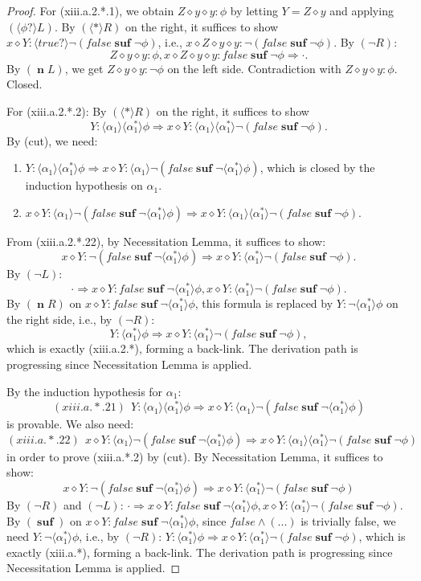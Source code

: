 \documentclass[manuscript,screen]{acmart}
\newcommand{\la}[0]{\langle}
\newcommand{\ra}[0]{\rangle}
\newcommand{\true}[0]{\mathit{true}}
\newcommand{\false}[0]{\mathit{false}}
\newcommand{\lup}[0]{*}
\newcommand{\cat}[0]{\diamond}
\DeclareMathOperator{\osuf}{\mathbf{suf}}
\DeclareMathOperator{\nxt}{\mathbf{n}}
\begin{document}
\begin{proof}
For (xiii.a.2.*.1), we obtain $Z\cat y\cat y : \phi$ by letting $Y = Z\cat y$ and applying $(\la\phi?\ra L)$. By $(\la\lup\ra R)$ on the right, it suffices to show $x\cat Y : \la\true?\ra\neg(\false\osuf\neg\phi)$, i.e., $x\cat Z\cat y\cat y : \neg(\false\osuf\neg\phi)$. By $(\neg R)$: 
$$Z\cat y\cat y : \phi, x\cat Z\cat y\cat y : \false\osuf\neg\phi\Rightarrow \cdot.$$ 
By $(\nxt L)$, we get $Z\cat y\cat y : \neg\phi$ on the left side. Contradiction with $Z\cat y\cat y : \phi$. Closed.

For (xiii.a.2.*.2): By $(\la\lup\ra R)$ on the right, it suffices to show 
$$Y : \la\alpha_1\ra\la\alpha^*_1\ra\phi\Rightarrow x\cat Y : \la\alpha_1\ra\la\alpha_1^*\ra\neg(\false\osuf\neg\phi).$$
By (cut), we need:
\begin{enumerate}
\item[(xiii.a.2.*.21)] $Y : \la\alpha_1\ra\la\alpha_1^*\ra\phi\Rightarrow x\cat Y : \la\alpha_1\ra\neg(\false\osuf\neg\la\alpha_1^*\ra\phi)$, which is closed by the induction hypothesis on $\alpha_1$. 
\item[(xiii.a.2.*.22)] $x\cat Y : \la\alpha_1\ra\neg(\false\osuf\neg\la\alpha_1^*\ra\phi)\Rightarrow x\cat Y : \la\alpha_1\ra\la\alpha_1^*\ra\neg(\false\osuf\neg\phi)$. 
\end{enumerate}
From (xiii.a.2.*.22), by Necessitation Lemma, it suffices to show:
$$
x\cat Y : \neg(\false\osuf\neg\la\alpha_1^*\ra\phi)\Rightarrow x\cat Y : \la\alpha_1^*\ra\neg(\false\osuf\neg\phi). 
$$
By $(\neg L)$: $$\cdot\Rightarrow x\cat Y : \false\osuf\neg\la\alpha_1^*\ra\phi, x\cat Y : \la\alpha_1^*\ra\neg(\false\osuf\neg\phi).$$ 
By $(\nxt R)$ on $x\cat Y : \false\osuf\neg\la\alpha_1^*\ra\phi$, this formula is replaced by $Y : \neg\la\alpha_1^*\ra\phi$ on the right side, i.e., by $(\neg R)$: $$Y : \la\alpha_1^*\ra\phi\Rightarrow x\cat Y : \la\alpha_1^*\ra\neg(\false\osuf\neg\phi),$$ which is exactly (xiii.a.2.*), forming a back-link. The derivation path is progressing since Necessitation Lemma is applied. 

\ifx
By the induction hypothesis for $\alpha_1$:
$$
(xiii.a.*.21)\ \ Y : \la\alpha_1\ra\la\alpha_1^*\ra\phi\Rightarrow x\cat Y : \la\alpha_1\ra\neg(\false\osuf\neg\la\alpha_1^*\ra\phi)
$$
is provable. We also need:
$$
(xiii.a.*.22)\ \ x\cat Y : \la\alpha_1\ra\neg(\false\osuf\neg\la\alpha_1^*\ra\phi)\Rightarrow x\cat Y : \la\alpha_1\ra\la\alpha_1^*\ra\neg(\false\osuf\neg\phi)
$$
in order to prove (xiii.a.*.2) by (cut). 
By Necessitation Lemma, it suffices to show:
$$
x\cat Y : \neg(\false\osuf\neg\la\alpha_1^*\ra\phi)\Rightarrow x\cat Y : \la\alpha_1^*\ra\neg(\false\osuf\neg\phi)
$$
By $(\neg R)$ and $(\neg L)$: $\cdot\Rightarrow x\cat Y : \false\osuf\neg\la\alpha_1^*\ra\phi, x\cat Y : \la\alpha_1^*\ra\neg(\false\osuf\neg\phi)$. By $(\osuf)$ on $x\cat Y : \false\osuf\neg\la\alpha_1^*\ra\phi$, since $\false\wedge(...)$ is trivially false, we need $Y : \neg\la\alpha_1^*\ra\phi$, i.e., by $(\neg R)$: $Y : \la\alpha_1^*\ra\phi\Rightarrow x\cat Y : \la\alpha_1^*\ra\neg(\false\osuf\neg\phi)$, which is exactly (xiii.a.*), forming a back-link. The derivation path is progressing since Necessitation Lemma is applied. 
\fi


\end{proof}
\end{document}
